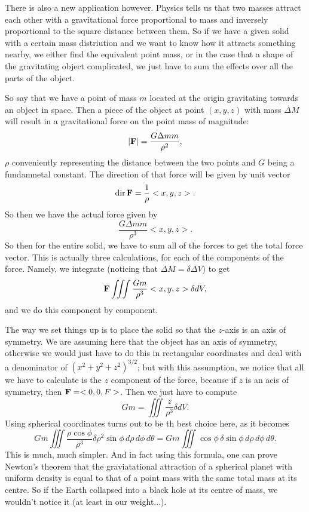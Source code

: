 There is also a new application however. Physics tells us that two masses attract each other with a gravitational force proportional to mass and inversely proportional to the square distance between them. So if we have a given solid with a certain mass distriution and we want to know how it attracts something nearby, we either find the equivalent point mass, or in the case that a shape of the gravitating object complicated, we just have to sum the effects over all the parts of the object.  

So say that we have a point of mass $m$ located at the origin gravitating towards an object in space. Then a piece of the object at point $(x,y,z)$ with mass $\Delta M$ will result in a gravitational force on the point mass of magnitude:
\[ |\boldsymbol{\mathbf{F}}| = \frac{G\Delta m m}{\rho^2}, \]
$\rho$ conveniently representing the distance between the two points and $G$ being a fundamnetal constant. The direction of that force will be given by unit vector
\[ \mathrm{dir}\,\boldsymbol{\mathbf{F}} = \frac 1 \rho <x,y,z>. \]
So then we have the actual force given by
\[ \frac{G\Delta m m}{\rho^3} <x,y,z>. \]
So then for the entire solid, we have to sum all of the forces to get the total force vector. This is actually three calculations, for each of the components of the force. Namely, we integrate (noticing that $\Delta M = \delta \Delta V$) to get
\[ \boldsymbol{\mathbf{F}} \iiint \frac{Gm}{\rho^3} <x,y,z> \delta dV, \]
and we do this component by component. 

The way we set things up is to place the solid so that the $z$-axis is an axis of symmetry. We are assuming here that the object has an axis of symmetry, otherwise we would just have to do this in rectangular coordinates and deal with a denominator of $(x^2+y^2+z^2)^{3/2}$; but with this assumption, we notice that all we have to calculate is the $z$ component of the force, because if $z$ is an acis of symmetry, then $\boldsymbol{\mathbf{F}} = <0,0,F>$. Then we just have to compute
\[ Gm = \iiint \frac z{\rho^3} \delta dV. \]
Using spherical coordinates turns out to be th best choice here, as it becomes
\[ Gm \iiint \frac {\rho \cos \phi}{\rho^3} \delta \rho^2 \sin \phi \,d\rho\,d\phi\,d\theta = Gm \iiint \cos \phi\, \delta \sin \phi \,d\rho\,d\phi\,d\theta. \]
This is much, much simpler. And in fact using this formula, one can prove Newton's theorem that the graviatational attraction of a spherical planet with uniform density is equal to that of a point mass with the same total mass at its centre. So if the Earth collapsed into a black hole at its centre of mass, we wouldn't notice it (at least in our weight...).